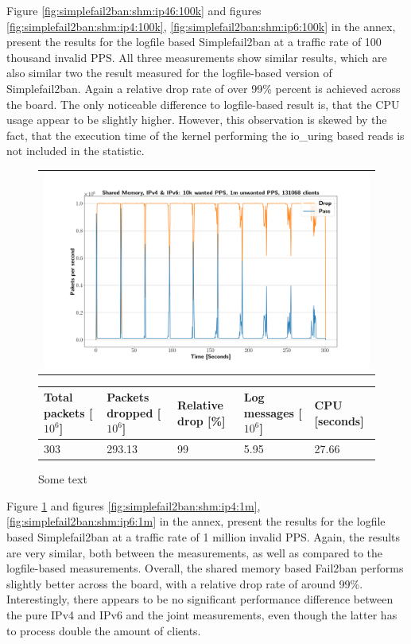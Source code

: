Figure \ref{fig:simplefail2ban:shm:ip46:100k} and figures \ref{fig:simplefail2ban:shm:ip4:100k}, \ref{fig:simplefail2ban:shm:ip6:100k} in the annex, present the results
for the logfile based Simplefail2ban at a traffic rate of 100 thousand invalid \ac{PPS}. All three measurements show similar results, which are also similar two the result measured for the logfile-based
version of Simplefail2ban. Again a relative drop rate of over 99\% percent is achieved across the board. The only noticeable difference to logfile-based result is, that the \ac{CPU} usage appear to be slightly higher.
However, this observation is skewed by the fact, that the execution time of the kernel performing the io\_uring based reads is not included in the statistic. 

\pagebreak

\begin{figure}[!h]
	\label{fig:simplefail2ban:shm:ip46:1m}
	\centering
	\scriptsize
	\begin{tabular}{c}
    	\centerline{\includegraphics[width=1.2\textwidth]{images/simplefail2ban_shm_ipv46_v10k_iv1m_c131068.png}}
	\end{tabular}
	\begin{tabular}{lllll}
		\toprule
		\textbf{Total packets [$10^6$]} & \textbf{Packets dropped [$10^6$]} & \textbf{Relative drop [\%]} & \textbf{Log messages [$10^6$]} & \textbf{CPU [seconds]} \\ \midrule 
		303 & 293.13 & 99 & 5.95 & 27.66 \\
		\bottomrule
	\end{tabular}
	\caption[Simplefail2ban, Shared Memory, IPv4 \& IPv6, 1m \ac{PPS}]{Some text}
\end{figure}

Figure \ref{fig:simplefail2ban:shm:ip46:1m} and figures \ref{fig:simplefail2ban:shm:ip4:1m}, \ref{fig:simplefail2ban:shm:ip6:1m} in the annex, present the results
for the logfile based Simplefail2ban at a traffic rate of 1 million invalid \ac{PPS}. Again, the results are very similar, both between the measurements, as well as compared to the logfile-based
measurements. Overall, the shared memory based Fail2ban performs slightly better across the board, with a relative drop rate of around 99\%. Interestingly, there appears 
to be no significant performance difference between the pure \ac{IPv4} and \ac{IPv6} and the joint measurements, even though
the latter has to process double the amount of clients.

